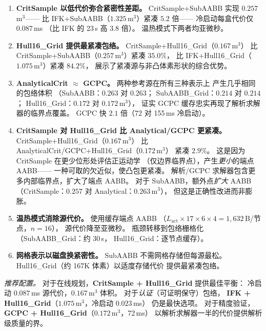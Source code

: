 \documentclass[journal]{IEEEtran}
\begin{document}
\begin{enumerate}
\item \textbf{CritSample 以低代价弥合紧密性差距。}
  CritSample+SubAABB 实现 $0.257$\,m$^3$——
  比 IFK+SubAABB（$1.325$\,m$^3$）紧凑 $5.2$ 倍——
  冷启动每盒代价仅 $0.087$\,ms
  （比 IFK 的 23\,\textmu s 高 $3.8$ 倍）。
  温热模式下两者均亚微秒。

\item \textbf{Hull16\_Grid 提供最紧凑包络。}
  CritSample+Hull16\_Grid（$0.167$\,m$^3$）
  比 CritSample+SubAABB（$0.257$\,m$^3$）紧凑 $35.0\%$，
  比 IFK+Hull16\_Grid（$1.075$\,m$^3$）紧凑 $84.2\%$，
  展示了紧凑源与非凸体素形状的综合优势。

\item \textbf{AnalyticalCrit $\approx$ GCPC。}
  两种参考源在所有三种表示上
  产生几乎相同的包络体积
  （SubAABB：$0.263$ 对 $0.263$；
   SubAABB\_Grid：$0.214$ 对 $0.214$；
   Hull16\_Grid：$0.172$ 对 $0.172$\,m$^3$），
  证实 GCPC 缓存忠实再现了解析求解器的临界点覆盖。
  GCPC 快 $2.1$ 倍（72 对 155\,ms 冷启动）。

\item \textbf{CritSample 对 Hull16\_Grid 比 Analytical/GCPC 更紧凑。}
  CritSample+Hull16\_Grid（$0.167$\,m$^3$）
  比 AnalyticalCrit/GCPC+Hull16\_Grid（$0.172$\,m$^3$）
  紧凑 $2.9\%$。
  这是因为 CritSample 在更少位形处评估正运动学
  （仅边界临界点），产生\emph{更小}的端点 AABB——
  一种可取的欠近似，使凸包更紧凑。
  解析/GCPC 求解器包含更多内部临界点，扩大了端点 AABB。
  对于 SubAABB，额外点\emph{扩大} AABB
  （CritSample：$0.257$ 对 Analytical：$0.263$\,m$^3$），
  但这是正确性改进而非膨胀。

\item \textbf{温热模式消除源代价。}
  使用缓存端点 AABB
  （$L_\text{act} {\times} 17 {\times} 6 {\times} 4
  = 1{,}632$\,B/节点，$n{=}16$），
  源代价降至亚微秒。
  瓶颈转移到包络栅格化
  （SubAABB\_Grid：约 30\,\textmu s，
  Hull16\_Grid：逐节点缓存）。

\item \textbf{网格表示以磁盘换紧密性。}
  SubAABB 不需网格存储但每源最松。
  Hull16\_Grid（约 167K 体素）以适度存储代价
  提供最紧凑包络。
\end{enumerate}

\emph{推荐配置。}
对于在线规划，\textbf{CritSample + Hull16\_Grid}
提供最佳平衡：
冷启动 $0.087$\,ms 源代价，$0.167$\,m$^3$ 体积。
对于\emph{认证}（可证明保守）包络，
\textbf{IFK + Hull16\_Grid}（$1.075$\,m$^3$，冷启动 $0.023$\,ms）
仍是最快选项。
对于精度验证，
\textbf{GCPC + Hull16\_Grid}（$0.172$\,m$^3$，72\,ms）
以解析求解器一半的代价提供解析级质量的界。
\end{document}
